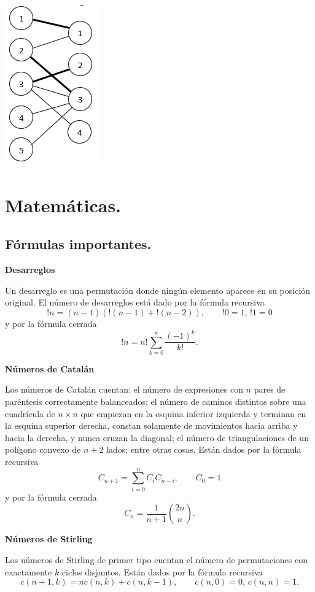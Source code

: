 \documentclass[12pt, letterpaper, twoside]{article}
\begin{document}
\begin{center}
\includegraphics[height = 0.27\textheight]{Grafos/Imagenes/MaxMatching.png}	
\end{center}

\newpage

\section{Matemáticas.}

\subsection{Fórmulas importantes.}

\textbf{Desarreglos}

Un desarreglo es una permutación donde ningún elemento aparece en su posición original. El número de desarreglos está dado por la fórmula recursiva 
$$!n = (n - 1)(!(n - 1) + !(n - 2)), \qquad !0 = 1, \, !1 = 0$$ 
y por la fórmula cerrada
$$!n = n! \sum_{k=0}^n \frac{(-1)^k}{k!}.$$

\textbf{Números de Catalán}

Los números de Catalán cuentan: el número de expresiones con $n$ pares de paréntesis correctamente balanceados; el número de caminos distintos sobre una cuadrícula de $n \times n$ que empiezan en la esquina inferior izquierda y terminan en la esquina superior derecha, constan solamente de movimientos hacia arriba y hacia la derecha, y nunca cruzan la diagonal; el número de triangulaciones de un polígono convexo de $n + 2$ lados; entre otras cosas. Están dados por la fórmula recursiva
$$C_{n+1} = \sum_{i=0}^n C_iC_{n-i}, \qquad C_0 = 1$$
y por la fórmula cerrada
$$C_n = \frac{1}{n + 1}\binom{2n}{n}.$$

\textbf{Números de Stirling}

Los números de Stirling de primer tipo cuentan el número de permutaciones con exactamente $k$ ciclos disjuntos. Están dados por la fórmula recursiva
$$c(n + 1, k) = nc(n, k) + c(n, k - 1), \qquad c(n, 0) =  0, \, c(n, n) = 1.$$
\end{document}
